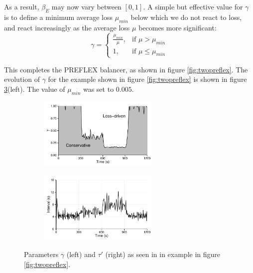 As a result, $\beta_E$ may now vary between $[0,1]$. 
A simple but effective value for $\gamma$ is to define a minimum average loss $\mu_{min}$ below which we do not react to loss, and react increasingly as the average loss $\mu$ becomes more significant:
\begin{equation}
\gamma = 
\begin{cases} 
\frac{\mu_{min}}{\mu}, & \mbox{if }\mu > \mu_{min}\\
1, & \mbox{if }\mu \leq \mu_{min}
\end{cases}
\end{equation}

This completes the \ac{PREFLEX} balancer, as shown in figure \ref{fig:twopreflex}. 
The evolution of $\gamma$ for the example shown in figure \ref{fig:twopreflex} is shown in figure \ref{fig:tune}(left). 
The value of $\mu_{min}$ was set to $0.005$.

\begin{figure}
    \begin{subfigure}[b]{.5\linewidth}
        \centering
        \includegraphics[width=2.25in]{figures/cate/gamma}
        \caption{}
        \label{fig:gamma}
    \end{subfigure}
    \begin{subfigure}[b]{.5\linewidth}
        \centering
        \includegraphics[width=2.25in]{figures/cate/tau}
        \caption{}
        \label{fig:tau}
    \end{subfigure}
    \caption{Parameters $\gamma$ (left) and $\tau'$ (right) as seen in in example in figure \ref{fig:twopreflex}.}
    \label{fig:tune}
\end{figure}

